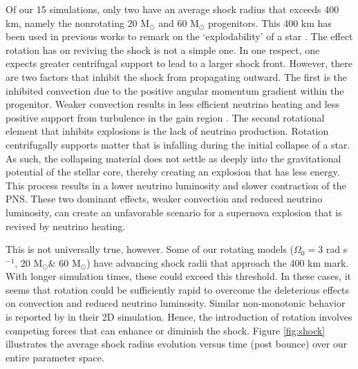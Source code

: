 \documentclass[twocolumn,times]{aastex62}  %
\newcommand{\Msun}{\ensuremath{\mathrm{M}_\odot}\xspace}
\begin{document}
Of our 15 simulations, only two have an  average shock radius that exceeds 400 km, namely the nonrotating 20 \Msun and 60 \Msun progenitors.  This 400 km has been used in previous works to remark on the `explodability' of a star \citep{couch:2013b}.
The effect rotation has on reviving the shock is not a simple one. 
In one respect, one expects greater centrifugal support to lead to a larger shock front.  However, there are two factors that inhibit the shock from propagating outward.  The first is the inhibited convection due to the positive angular momentum gradient within the progenitor. Weaker convection results in less efficient neutrino heating \citep{dolence:2013, murphy:2013} and less positive support from turbulence in the gain region \citep{couch:2015a, mabanta:2018}.  The  second rotational element that inhibits explosions is the lack of neutrino production.  Rotation centrifugally supports matter that is infalling during the initial collapse of a star.  As such, the collapsing material does not settle as deeply into the gravitational potential of the stellar core, thereby creating an explosion that has less energy.  This process results in a lower neutrino luminosity and slower contraction of the PNS. 
These two dominant effects, weaker convection and reduced neutrino luminosity, can create an unfavorable scenario for a supernova explosion that is revived by neutrino heating.

This is not universally true, however. 
Some of our rotating models ($\Omega_0 = 3$ rad s$^{-1}$, 20 \Msun \& 60 \Msun) have advancing shock radii that approach the 400 km mark.  With longer simulation times, these could exceed this threshold.  In these cases, it seems that rotation could be sufficiently rapid to overcome the deleterious effects on convection and reduced neutrino luminosity.
Similar non-monotonic behavior is reported by \citet{summa:2018} in their 2D simulation.
Hence, the introduction of rotation involves competing forces that can enhance or diminish the shock.  Figure \ref{fig:shock} illustrates the average shock radius evolution versus time (post bounce) over our entire parameter space.

\end{document}

